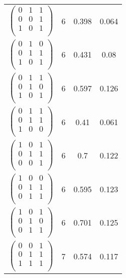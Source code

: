\documentclass{amsart}
\theoremstyle{definition}
\theoremstyle{remark}
\numberwithin{equation}{section}
\begin{document}
\begin{longtable}{ c || c | c | c }
$\begin{pmatrix}
0 & 1 & 1\\
0 & 0 & 1\\
1 & 0 & 1\\
\end{pmatrix}$ & 6 & 0.398 & 0.064\\
$\begin{pmatrix}
0 & 1 & 0\\
0 & 1 & 1\\
1 & 0 & 1\\
\end{pmatrix}$ & 6 & 0.431 & 0.08\\
$\begin{pmatrix}
0 & 1 & 1\\
0 & 1 & 0\\
1 & 0 & 1\\
\end{pmatrix}$ & 6 & 0.597 & 0.126\\
$\begin{pmatrix}
0 & 1 & 1\\
0 & 1 & 1\\
1 & 0 & 0\\
\end{pmatrix}$ & 6 & 0.41 & 0.061\\
$\begin{pmatrix}
1 & 0 & 1\\
0 & 1 & 1\\
0 & 0 & 1\\
\end{pmatrix}$ & 6 & 0.7 & 0.122\\
$\begin{pmatrix}
1 & 0 & 0\\
0 & 1 & 1\\
0 & 1 & 1\\
\end{pmatrix}$ & 6 & 0.595 & 0.123\\
$\begin{pmatrix}
1 & 0 & 1\\
0 & 1 & 0\\
0 & 1 & 1\\
\end{pmatrix}$ & 6 & 0.701 & 0.125\\
$\begin{pmatrix}
0 & 0 & 1\\
0 & 1 & 1\\
1 & 1 & 1\\
\end{pmatrix}$ & 7 & 0.574 & 0.117\\

\end{longtable}
\end{document}
